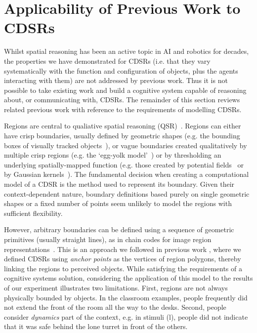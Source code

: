 \documentclass[11pt,letterpaper]{article}
\begin{document}
\section{Applicability of Previous Work to CDSRs}

Whilst spatial reasoning has been an active topic in AI and robotics for decades, the properties we have demonstrated for CDSRs (i.e. that they vary systematically with the function and configuration of objects, plus the agents interacting with them) are not addressed by previous work.  Thus it is not possible to take existing work and build a cognitive system capable of reasoning about, or communicating with, CDSRs.  The remainder of this section reviews related previous work with reference to the requirements of modelling CDSRs.
 
Regions are central to qualiative spatial reasoning (QSR)~\cite{Cohn:2001}. Regions can either have crisp boundaries, usually defined by geometric shapes (e.g. the bounding boxes of visually tracked objects~\cite{SridharCohn:10}), or vague boundaries created qualitatively by multiple crisp regions (e.g. the `egg-yolk model'~\cite{Cohn96b}) or by thresholding an underlying spatially-mapped function (e.g. those created by potential fields~\cite{brenneretal07ijcai} or by Gaussian kernels~\cite{burbridge-dearden12}). The fundamental decision when creating a computational model of a CDSR is the method used to represent its boundary. Given their context-dependent nature, boundary definitions based purely on single geometric shapes or a fixed number of points seem unlikely to model the regions with sufficient flexibility.

However, arbitrary boundaries can be defined using a sequence of geometric primitives (usually straight lines), as in chain codes for image region representations~\cite{Freeman:1961}. This is an approach we followed in previous work \cite{Hawes:2012}, where we defined CDSRs using \textit{anchor points} \cite{DBLP:journals/jetai/KlenkFTK11} as the vertices of region polygons, thereby linking the regions to perceived objects.  While satisfying the requirements of a cognitive systems solution, considering the application of this model to the  results of our experiment illustrates two limitations.  First, regions are not always physically bounded by objects.  In the classroom examples, people frequently did not extend the front of the room all the way to the desks.  Second, people consider \emph{dynamics} part of the context, e.g. in stimuli (l), people did not indicate that it was safe behind the lone turret in front of the others.
\end{document}
